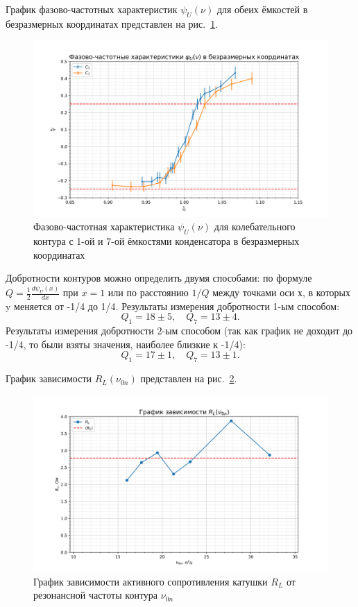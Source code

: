 \documentclass[a4paper, 12pt]{article}
\begin{document}
График фазово-частотных характеристик $\psi_U(\nu)$ для обеих ёмкостей в безразмерных координатах представлен на рис.~\ref{plot3}.

\begin{figure}[h!]
\begin{center}
    \includegraphics[scale=0.7]{3.2.3_3.png}
\end{center}
\caption{Фазово-частотная характеристика $\psi_U(\nu)$ для колебательного контура с 1-ой и 7-ой ёмкостями конденсатора в безразмерных координатах}
\label{plot3}
\end{figure}

Добротности контуров можно определить двумя способами: по формуле $Q = \frac{1}{2}\frac{d\psi_U(x)}{dx}$ при $x = 1$ или по расстоянию $1/Q$ между точками оси х, в которых y меняется от -1/4 до 1/4. Результаты измерения добротности 1-ым способом:
$$ Q_1 = 18\pm5, \quad Q_7 = 13\pm4.$$
Результаты измерения добротности 2-ым способом (так как график не доходит до -1/4, то были взяты значения, наиболее близкие к -1/4):
$$ Q_1 = 17\pm1, \quad Q_7 = 13\pm1.$$

График зависимости $R_L(\nu_{0n})$ представлен на рис.~\ref{plot4}.

\begin{figure}[h!]
\begin{center}
    \includegraphics[scale=0.7]{3.2.3_4.png}
\end{center}
\caption{График зависимости активного сопротивления катушки $R_L$ от резонансной частоты контура $\nu_{0n}$}
\label{plot4}
\end{figure}
\end{document}
